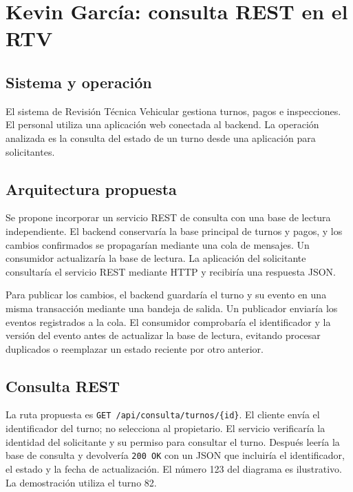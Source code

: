 \documentclass[10pt,a4paper,twocolumn]{article}
\begin{document}
\section{Kevin García: consulta REST en el RTV}



\subsection{Sistema y operación}

El sistema de Revisión Técnica Vehicular gestiona turnos, pagos e inspecciones. El personal utiliza una aplicación web conectada al backend. La operación analizada es la consulta del estado de un turno desde una aplicación para solicitantes.



\subsection{Arquitectura propuesta}

Se propone incorporar un servicio REST de consulta con una base de lectura independiente. El backend conservaría la base principal de turnos y pagos, y los cambios confirmados se propagarían mediante una cola de mensajes. Un consumidor actualizaría la base de lectura. La aplicación del solicitante consultaría el servicio REST mediante HTTP y recibiría una respuesta JSON.



Para publicar los cambios, el backend guardaría el turno y su evento en una misma transacción mediante una bandeja de salida. Un publicador enviaría los eventos registrados a la cola. El consumidor comprobaría el identificador y la versión del evento antes de actualizar la base de lectura, evitando procesar duplicados o reemplazar un estado reciente por otro anterior.



\subsection{Consulta REST}

La ruta propuesta es \texttt{GET /api/consulta/turnos/\{id\}}. El cliente envía el identificador del turno; no selecciona al propietario. El servicio verificaría la identidad del solicitante y su permiso para consultar el turno. Después leería la base de consulta y devolvería \texttt{200 OK} con un JSON que incluiría el identificador, el estado y la fecha de actualización. El número 123 del diagrama es ilustrativo. La demostración utiliza el turno 82.
\end{document}
